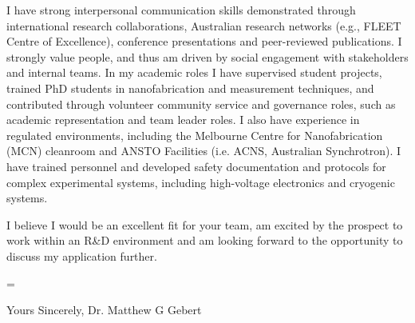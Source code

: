 \documentclass[10pt,a4paper,ragged2e,withhyper,paragraphstrue]{altacv}
\newcommand{\textalignment}{
	\justifying
    \tolerance=1 %
    \emergencystretch=\maxdimen
    \hyphenpenalty=10000 
    \hbadness=10000
}
\begin{document}
{    %
    I have strong interpersonal communication skills demonstrated through international research collaborations, Australian research networks (e.g., FLEET Centre of Excellence), conference presentations and peer-reviewed publications. I strongly value people, and thus am driven by social engagement with stakeholders and internal teams. In my academic roles I have supervised student projects, trained PhD students in nanofabrication and measurement techniques, and contributed through volunteer community service and governance roles, such as academic representation and team leader roles. I also have experience in regulated environments, including the Melbourne Centre for Nanofabrication (MCN) cleanroom and ANSTO Facilities (i.e. ACNS, Australian Synchrotron). I have trained personnel and developed safety documentation and protocols for complex experimental systems, including high-voltage electronics and cryogenic systems. 
    
    I believe I would be an excellent fit for your team, am excited by the prospect to work within an R\&D environment and am looking forward to the opportunity to discuss my application further.
    }

    {\color{emphasis}
    \textalignment

    \vspace{0.5em}

    Yours Sincerely, \newline
    {\color{emphasis}\hspace{0.5cm}Dr. Matthew G Gebert}

    }
    
    \divider
\end{document}
